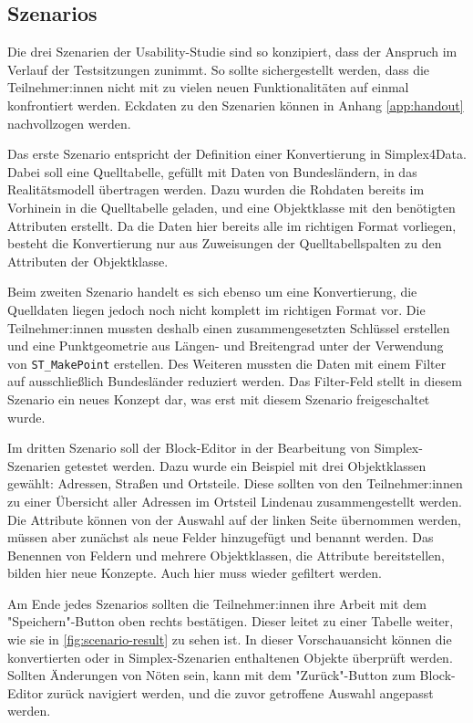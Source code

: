 \subsection{Szenarios}
\label{sec:study-szenarios}
Die drei Szenarien der Usability-Studie sind so konzipiert, dass der Anspruch im Verlauf der Testsitzungen zunimmt. So sollte sichergestellt werden, dass die Teilnehmer:innen nicht mit zu vielen neuen Funktionalitäten auf einmal konfrontiert werden. Eckdaten zu den Szenarien können in Anhang \ref{app:handout} nachvollzogen werden.

Das erste Szenario entspricht der Definition einer Konvertierung in Simplex4Data. Dabei soll eine Quelltabelle, gefüllt mit Daten von Bundesländern, in das Realitätsmodell übertragen werden. Dazu wurden die Rohdaten bereits im Vorhinein in die Quelltabelle geladen, und eine Objektklasse mit den benötigten Attributen erstellt.  Da die Daten hier bereits alle im richtigen Format vorliegen, besteht die Konvertierung nur aus Zuweisungen der Quelltabellspalten zu den Attributen der Objektklasse. 

Beim zweiten Szenario handelt es sich ebenso um eine Konvertierung, die Quelldaten liegen jedoch noch nicht komplett im richtigen Format vor. Die Teilnehmer:innen mussten deshalb einen zusammengesetzten Schlüssel erstellen und eine Punktgeometrie aus Längen- und Breitengrad unter der Verwendung von \texttt{ST\_MakePoint} erstellen. Des Weiteren mussten die Daten mit einem Filter auf ausschließlich Bundesländer reduziert werden. Das Filter-Feld stellt in diesem Szenario ein neues Konzept dar, was erst mit diesem Szenario freigeschaltet wurde.

Im dritten Szenario soll der Block-Editor in der Bearbeitung von Simplex-Szenarien getestet werden. Dazu wurde ein Beispiel mit drei Objektklassen gewählt: Adressen, Straßen und Ortsteile. Diese sollten von den Teilnehmer:innen zu einer Übersicht aller Adressen im Ortsteil Lindenau zusammengestellt werden. Die Attribute können von der Auswahl auf der linken Seite übernommen werden, müssen aber zunächst als neue Felder hinzugefügt und benannt werden. Das Benennen von Feldern und mehrere Objektklassen, die Attribute bereitstellen, bilden hier neue Konzepte. Auch hier muss wieder gefiltert werden.

Am Ende jedes Szenarios sollten die Teilnehmer:innen ihre Arbeit mit dem "Speichern"-Button oben rechts bestätigen. Dieser leitet zu einer Tabelle weiter, wie sie in \ref{fig:scenario-result} zu sehen ist. In dieser Vorschauansicht können die konvertierten oder in Simplex-Szenarien enthaltenen Objekte überprüft werden. Sollten Änderungen von Nöten sein, kann mit dem "Zurück"-Button zum Block-Editor zurück navigiert werden, und die zuvor getroffene Auswahl angepasst werden.

